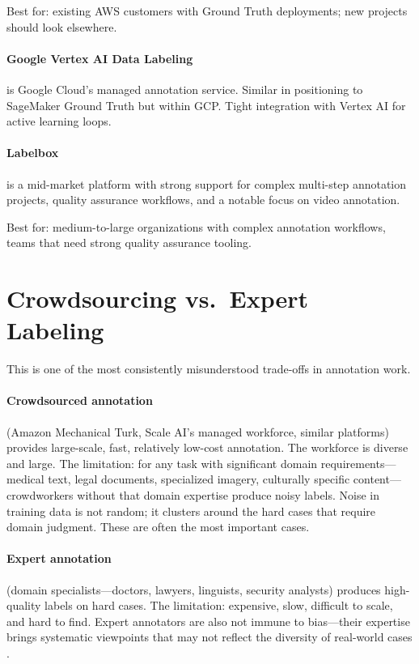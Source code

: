 Best for: existing AWS customers with Ground Truth deployments; new projects should look elsewhere.

\paragraph{Google Vertex AI Data Labeling} is Google Cloud's managed annotation service. Similar in positioning to SageMaker Ground Truth but within GCP. Tight integration with Vertex AI for active learning loops.

\paragraph{Labelbox} is a mid-market platform with strong support for complex multi-step annotation projects, quality assurance workflows, and a notable focus on video annotation.

Best for: medium-to-large organizations with complex annotation workflows, teams that need strong quality assurance tooling.

\section{Crowdsourcing vs.\ Expert Labeling}
\label{sec:ch09-crowd-vs-expert}

This is one of the most consistently misunderstood trade-offs in annotation work.

\paragraph{Crowdsourced annotation} (Amazon Mechanical Turk, Scale AI's managed workforce, similar platforms) provides large-scale, fast, relatively low-cost annotation. The workforce is diverse and large. The limitation: for any task with significant domain requirements---medical text, legal documents, specialized imagery, culturally specific content---crowdworkers without that domain expertise produce noisy labels. Noise in training data is not random; it clusters around the hard cases that require domain judgment. These are often the most important cases.

\paragraph{Expert annotation} (domain specialists---doctors, lawyers, linguists, security analysts) produces high-quality labels on hard cases. The limitation: expensive, slow, difficult to scale, and hard to find. Expert annotators are also not immune to bias---their expertise brings systematic viewpoints that may not reflect the diversity of real-world cases \autocite{davani2022dealing}.

